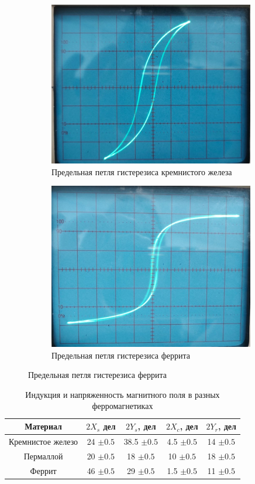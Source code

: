 \begin{figure}[h!]
    \begin{subfigure}[b]{0.55\linewidth}
        \centering
        \includegraphics[width=9cm]{images/kremni.jpg}
        \caption{Предельная петля гистерезиса кремнистого железа}
    \end{subfigure}
    \begin{subfigure}[b]{0.5\linewidth}
        \centering
        \includegraphics[width=9cm]{images/ferrit.jpg}
        \caption{Предельная петля гистерезиса феррита}
    \end{subfigure}
\end{figure}

\begin{table}[h!]
    \centering
    \begin{tabular}{|c|c|c|c|c|}
        \hline
        Материал & $2X_s$ дел & $2Y_s$, дел & $2X_c$, дел & $2Y_r$, дел \\\hline 
        Кремнистое железо    & 24 $\pm 0.5$ & 38.5 $\pm 0.5$ & 4.5 $\pm 0.5$ & 14 $\pm 0.5$ \\\hline
        Пермаллой            & 20 $\pm 0.5$ & 18   $\pm 0.5$ & 10  $\pm 0.5$ & 18 $\pm 0.5$ \\\hline
        Феррит               & 46 $\pm 0.5$ & 29   $\pm 0.5$ & 1.5 $\pm 0.5$ & 11 $\pm 0.5$ \\\hline
    \end{tabular}
    \caption{Индукция и напряженность магнитного поля в разных ферромагнетиках}
\end{table}
\newpage

